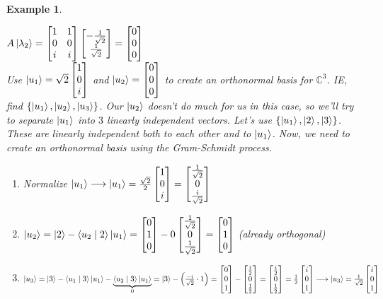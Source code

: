 \documentclass[12pt]{article}
\theoremstyle{plain}
\theoremstyle{nonumberplain}
\theoremstyle{plain}
\newtheorem{example}[lemma]{Example}
\theoremstyle{nonumberplain}
\newcommand\1{{\bf 1}}
\newcommand{\bmat}[1]{\begin{bmatrix*} #1 \end{bmatrix*}} %
\newcommand{\C}{\mathbb{C}} %
\newcommand{\<}{\left\langle}
\renewcommand{\>}{\right\rangle}
\newcommand{\inp}[2]{\left\langle#1\mid #2\right\rangle} %
\begin{document}
\begin{example}
\begin{enumerate}
$A\ket{\lambda_2}=\bmat{1 & 1 \\ 0 & 0 \\ i & i}\bmat{-\frac{1}{\sqrt{2}} \\ \frac{1}{\sqrt{2}}}=\bmat{0 \\ 0 \\ 0}$ \\
Use $\ket{u_1}=\sqrt{2}\bmat{1 \\ 0 \\ i}$ and $\ket{u_2}=\bmat{0 \\ 0 \\ 0}$ to create an orthonormal basis for $\C^3$. IE, find $\lbrace\ket{u_1},\ket{u_2},\ket{u_3}\rbrace$. Our $\ket{u_2}$ doesn't do much for us in this case, so we'll try to separate $\ket{u_1}$ into $3$ linearly independent vectors. Let's use $\lbrace\ket{u_1},\ket{2},\ket{3}\rbrace$. These are linearly independent both to each other and to $\ket{u_1}$. Now, we need to create an orthonormal basis using the Gram-Schmidt process. \\
\begin{enumerate}
\item Normalize $\ket{u_1}\longrightarrow\ket{u_1}=\frac{\sqrt{2}}{2}\bmat{1 \\ 0 \\ i}=\bmat{\frac{1}{\sqrt{2}} \\ 0 \\ \frac{i}{\sqrt{2}}}$
\item $\ket{u_2}=\ket{2}-\inp{u_2}{2}\ket{u_1}=\bmat{0 \\ 1 \\ 0}-0\bmat{\frac{1}{\sqrt{2}} \\ 0 \\ \frac{1}{\sqrt{2}}}=\bmat{0 \\ 1 \\ 0}$ (already orthogonal)
\item $\ket{u_3}=\ket{3}-\inp{u_1}{3}\ket{u_1}-\underbrace{\textstyle \inp{u_2}{3}\ket{u_1}}_{\mathclap{0}}=\ket{3}-\left(\frac{-i}{\sqrt{2}}\cdot 1\right)=\bmat{0 \\ 0 \\ 1}-\bmat{\frac{i}{2} \\ 0 \\ \frac{1}{2}}=\bmat{\frac{i}{2} \\ 0 \\ \frac{1}{2}}=\frac{1}{2}\bmat{i \\ 0 \\ 1}\longrightarrow\ket{u_3}=\frac{1}{\sqrt{2}}\bmat{i \\ 0 \\ 1}$ \\

\end{enumerate}
\end{enumerate}
\end{example}
\end{document}

